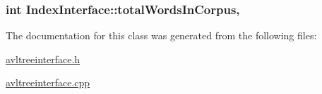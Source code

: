 \subsubsection[{total\+Words\+In\+Corpus}]{\setlength{\rightskip}{0pt plus 5cm}int Index\+Interface\+::total\+Words\+In\+Corpus\hspace{0.3cm}{\ttfamily [protected]}, {\ttfamily [inherited]}}\label{class_index_interface_ab607b430e78528cdb8bb79ba4afa91d2}


The documentation for this class was generated from the following files\+:\begin{DoxyCompactItemize}
\item 
\hyperlink{avltreeinterface_8h}{avltreeinterface.\+h}\item 
\hyperlink{avltreeinterface_8cpp}{avltreeinterface.\+cpp}\end{DoxyCompactItemize}
